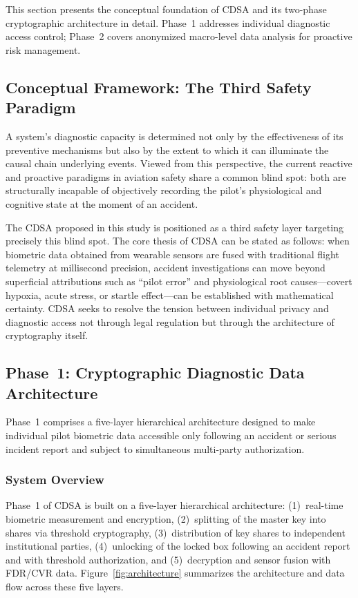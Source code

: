 \documentclass[12pt,a4paper]{article}
\begin{document}
This section presents the conceptual foundation of CDSA and its two-phase cryptographic
architecture in detail. Phase~1 addresses individual diagnostic access control;
Phase~2 covers anonymized macro-level data analysis for proactive risk management.

\subsection{Conceptual Framework: The Third Safety Paradigm}

A system's diagnostic capacity is determined not only by the effectiveness of its preventive
mechanisms but also by the extent to which it can illuminate the causal chain underlying events.
Viewed from this perspective, the current reactive and proactive paradigms in aviation safety
share a common blind spot: both are structurally incapable of objectively recording the pilot's
physiological and cognitive state at the moment of an accident.

The CDSA proposed in this study is positioned as a third safety layer targeting precisely this
blind spot. The core thesis of CDSA can be stated as follows: when biometric data obtained from
wearable sensors are fused with traditional flight telemetry at millisecond precision, accident
investigations can move beyond superficial attributions such as ``pilot error'' and physiological
root causes---covert hypoxia, acute stress, or startle effect---can be established with
mathematical certainty. CDSA seeks to resolve the tension between individual privacy and diagnostic
access not through legal regulation but through the architecture of cryptography itself.

\subsection{Phase~1: Cryptographic Diagnostic Data Architecture}

Phase~1 comprises a five-layer hierarchical architecture designed to make individual pilot
biometric data accessible only following an accident or serious incident report and subject
to simultaneous multi-party authorization.

\subsubsection{System Overview}

Phase~1 of CDSA is built on a five-layer hierarchical architecture: (1)~real-time biometric
measurement and encryption, (2)~splitting of the master key into shares via threshold
cryptography, (3)~distribution of key shares to independent institutional parties,
(4)~unlocking of the locked box following an accident report and with threshold authorization,
and (5)~decryption and sensor fusion with FDR/CVR data. Figure~\ref{fig:architecture}
summarizes the architecture and data flow across these five layers.
\end{document}
